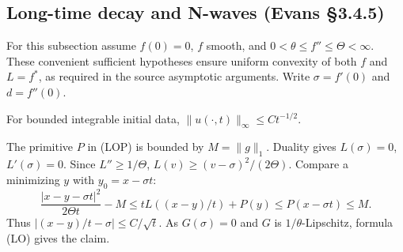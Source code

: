 \subsection{Long-time decay and N-waves (Evans \S3.4.5)}
For this subsection assume $f(0)=0$, $f$ smooth, and
$0<\theta\leq f''\leq\Theta<\infty$.
These convenient sufficient hypotheses ensure uniform convexity of
both $f$ and $L=f^*$, as required in the source asymptotic arguments.
Write $\sigma=f'(0)$ and $d=f''(0)$.

\begin{theorem}
For bounded integrable initial data,
$\|u(\cdot,t)\|_\infty\leq C t^{-1/2}$.
\end{theorem}
\begin{expandedproof}
The primitive $P$ in (LOP) is bounded by $M=\|g\|_1$.
Duality gives $L(\sigma)=0$, $L'(\sigma)=0$.
Since $L''\geq1/\Theta$,
$L(v)\geq(v-\sigma)^2/(2\Theta)$.
Compare a minimizing $y$ with $y_0=x-\sigma t$:
\[
 \frac{|x-y-\sigma t|^2}{2\Theta t}-M
 \leq tL((x-y)/t)+P(y)\leq P(x-\sigma t)\leq M.
\]
Thus $|(x-y)/t-\sigma|\leq C/\sqrt t$.
As $G(\sigma)=0$ and $G$ is $1/\theta$-Lipschitz,
formula (LO) gives the claim.
\end{expandedproof}
\Needspace{45mm}

